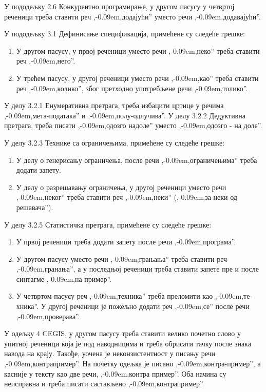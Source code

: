 \documentclass[a4paper]{report}
\def\zn{,\kern-0.09em,}
\begin{document}
\par У пододељку 2.6 Конкурентно програмирање, у другом пасусу у четвртој реченици треба ставити реч \zn додајући'' уместо речи \zn додавајући''.

\par У пододељку 3.1 Дефинисање спецификација, примећене су следеће грешке:
\begin{enumerate}
\item У другом пасусу, у првој реченици уместо речи \zn неко'' треба ставити реч \zn него''.
\item У трећем пасусу, у другој реченици уместо речи \zn као'' треба ставити реч \zn колико'', због претходно употребљене речи \zn толико''.
\end{enumerate}

\par У делу 3.2.1 Енумеративна претрага, треба избацити цртице у речима \zn мета-података'' и \zn полу-одлучива''. У делу 3.2.2 Дедуктивна претрага, треба писати \zn одозго надоле'' уместо \zn одозго - на доле''.

\par У делу 3.2.3 Технике са ограничењима, примећене су следеће грешке:
\begin{enumerate}
\item У делу о генерисању ограничења, после речи \zn ограничењима'' треба додати запету.
\item У делу о разрешавању ограничења, у другој реченици уместо речи \zn неког'' треба ставити реч \zn неки'' (\zn за неки од решавача'').
\end{enumerate}

\par У делу 3.2.5 Статистичка претрага, примећене су следеће грешке:
\begin{enumerate}
\item У првој реченици треба додати запету после речи \zn програма''.
\item У другом пасусу уместо речи \zn грањања'' треба ставити реч \zn гранања'', а у последњој реченици треба ставити запете пре и после синтагме \zn на пример''.
\item У четвртом пасусу реч \zn техника'' треба преломити као \zn те-хника''. У другој реченици је пожељно додати реч \zn се'' после речи \zn проверава''.
\end{enumerate}

\par У одељку 4 CEGIS, у другом пасусу треба ставити велико почетно слово у упитној реченици која је под наводницима и треба обрисати тачку после знака навода на крају. Такође, уочена је неконзистентност у писању речи \zn контрапример''. На почетку одељка је писано \zn контра-пример'', а касније у тексту као две речи, \zn контра пример''. Оба начина су неисправна и треба писати састављено \zn контрапример''.
\end{document}
